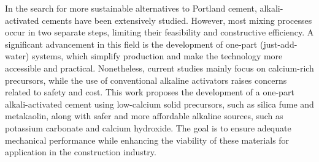 In the search for more sustainable alternatives to Portland cement, alkali-activated cements have been extensively studied. However, most mixing processes occur in two separate steps, limiting their feasibility and constructive efficiency. A significant advancement in this field is the development of one-part (just-add-water) systems, which simplify production and make the technology more accessible and practical. Nonetheless, current studies mainly focus on calcium-rich precursors, while the use of conventional alkaline activators raises concerns related to safety and cost. This work proposes the development of a one-part alkali-activated cement using low-calcium solid precursors, such as silica fume and metakaolin, along with safer and more affordable alkaline sources, such as potassium carbonate and calcium hydroxide. The goal is to ensure adequate mechanical performance while enhancing the viability of these materials for application in the construction industry.